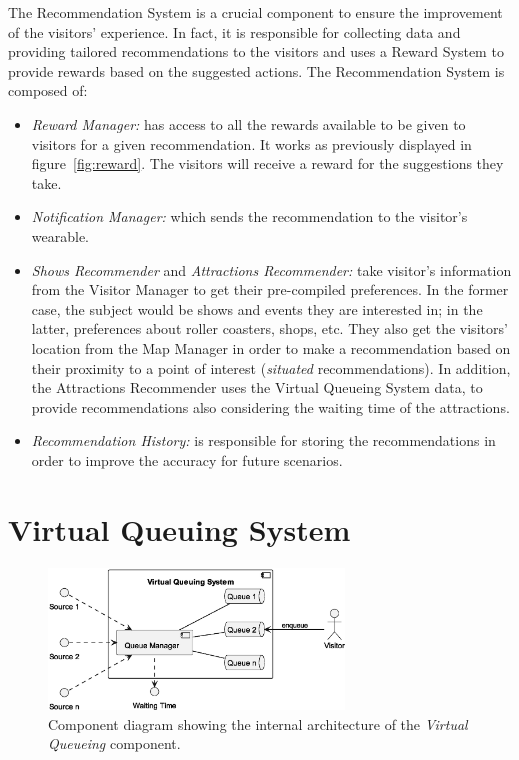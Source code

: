 The Recommendation System is a crucial component to ensure the improvement of the visitors' experience. In fact, it is responsible for collecting
data and providing tailored recommendations to the visitors and uses a Reward System to provide rewards based on the suggested actions. The
Recommendation System is composed of:
\begin{itemize}
	\item \textit{Reward Manager:} has access to all the rewards available to be given to visitors for a given recommendation. It works as previously displayed in figure~\ref{fig:reward}.
	      The visitors will receive a reward for the suggestions they take.
	\item \textit{Notification Manager:} which sends the recommendation to the visitor's wearable.
	\item \textit{Shows Recommender} and \textit{Attractions Recommender:} take visitor's information from the Visitor Manager to get their pre-compiled preferences.
	      In the former case, the subject would be shows and events they are interested in; in the latter, preferences about roller coasters, shops, etc. They also get the visitors' location from the Map Manager in order to make a recommendation based on their proximity to a point of interest (\textit{situated} recommendations).
	      In addition, the Attractions Recommender uses the Virtual Queueing System data, to provide recommendations also considering the waiting time of the attractions.
	\item \textit{Recommendation History:} is responsible for storing the recommendations in order to improve the accuracy for future scenarios.
\end{itemize}

\section{Virtual Queuing System}
\begin{figure}[H]
	\centering
	\includegraphics[width=0.7\textwidth]{img/virtual-queuing.eps}
	\caption{Component diagram showing the internal architecture of the \textit{Virtual Queueing} component.
	}
	\label{fig:virtual-queueing-arch}
\end{figure}

